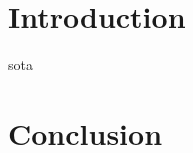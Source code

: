 \documentclass[12pt]{report}
\begin{document}
\setlength{\parskip}{1em}
\renewcommand{\baselinestretch}{2.0}

\newpage
{}
\setcounter{page}{1}

\chapter*{Introduction}
{sota}

\chapter*{Conclusion}
% 	
\end{document}
